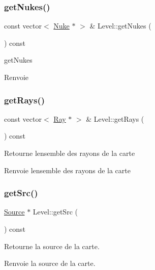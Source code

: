 \subsubsection{\texorpdfstring{getNukes()}{getNukes()}}
{\footnotesize\ttfamily const vector$<$ \mbox{\hyperlink{class_nuke}{Nuke}} $\ast$ $>$ \& Level\+::get\+Nukes (\begin{DoxyParamCaption}{ }\end{DoxyParamCaption}) const}



get\+Nukes 

\begin{DoxyReturn}{Renvoie}

\end{DoxyReturn}
\mbox{\label{class_level_a2e57737ceb0ed249c802cc6c47750b2e}} 
\subsubsection{\texorpdfstring{getRays()}{getRays()}}
{\footnotesize\ttfamily const vector$<$ \mbox{\hyperlink{class_ray}{Ray}} $\ast$ $>$ \& Level\+::get\+Rays (\begin{DoxyParamCaption}{ }\end{DoxyParamCaption}) const}

Retourne l\textquotesingle{}ensemble des rayons de la carte \begin{DoxyReturn}{Renvoie}
l\textquotesingle{}ensemble des rayons de la carte 
\end{DoxyReturn}
\mbox{\label{class_level_a9398c949ef35d0e2b4cc159d39c1f61b}} 
\subsubsection{\texorpdfstring{getSrc()}{getSrc()}}
{\footnotesize\ttfamily \mbox{\hyperlink{class_source}{Source}} $\ast$ Level\+::get\+Src (\begin{DoxyParamCaption}{ }\end{DoxyParamCaption}) const}

Retourne la source de la carte. \begin{DoxyReturn}{Renvoie}
la source de la carte. 
\end{DoxyReturn}
\mbox{\label{class_level_ad82a42f6a8d77da65dc012f5f8064d48}} 
